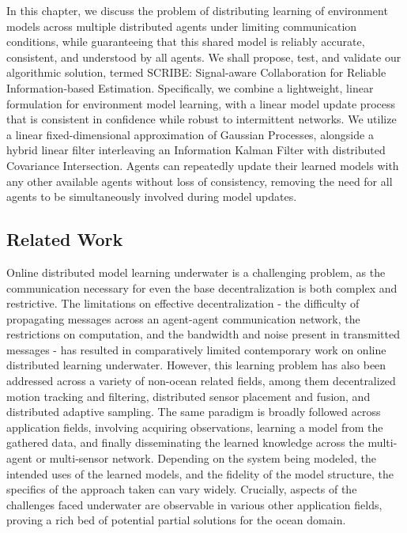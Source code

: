In this chapter, we discuss the problem of distributing learning of environment models across multiple distributed agents under limiting communication conditions, while guaranteeing that this shared model is reliably accurate, consistent, and understood by all agents. We shall propose, test, and validate our algorithmic solution, termed SCRIBE: Signal-aware Collaboration for Reliable Information-based Estimation. Specifically, we combine a lightweight, linear formulation for environment model learning, with a linear model update process that is consistent in confidence while robust to intermittent networks. We utilize a linear fixed-dimensional approximation of Gaussian Processes, alongside a hybrid linear filter interleaving an Information Kalman Filter with distributed Covariance Intersection. Agents can repeatedly update their learned models with any other available agents without loss of consistency, removing the need for all agents to be simultaneously involved during model updates.

\subsection{Related Work}

Online distributed model learning underwater is a challenging problem, as the communication necessary for even the base decentralization is both complex and restrictive. The limitations on effective decentralization - the difficulty of propagating messages across an agent-agent communication network, the restrictions on computation, and the bandwidth and noise present in transmitted messages - has resulted in comparatively limited contemporary work on online distributed learning underwater. However, this learning problem has also been addressed across a variety of non-ocean related fields, among them decentralized motion tracking and filtering, distributed sensor placement and fusion, and distributed adaptive sampling. The same paradigm is broadly followed across application fields, involving acquiring observations, learning a model from the gathered data, and finally disseminating the learned knowledge across the multi-agent or multi-sensor network. Depending on the system being modeled, the intended uses of the learned models, and the fidelity of the model structure, the specifics of the approach taken can vary widely. Crucially, aspects of the challenges faced underwater are observable in various other application fields, proving a rich bed of potential partial solutions for the ocean domain.

